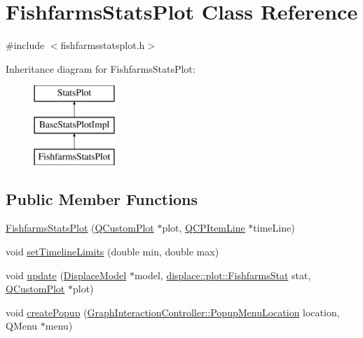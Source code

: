 \hypertarget{class_fishfarms_stats_plot}{}\section{Fishfarms\+Stats\+Plot Class Reference}
\label{class_fishfarms_stats_plot}


{\ttfamily \#include $<$fishfarmsstatsplot.\+h$>$}

Inheritance diagram for Fishfarms\+Stats\+Plot\+:\begin{figure}[H]
\begin{center}
\leavevmode
\includegraphics[height=3.000000cm]{da/d46/class_fishfarms_stats_plot}
\end{center}
\end{figure}
\subsection*{Public Member Functions}
\begin{DoxyCompactItemize}
\item 
\mbox{\hyperlink{class_fishfarms_stats_plot_aaf74f522a65c0403993f60f1a1a23f09}{Fishfarms\+Stats\+Plot}} (\mbox{\hyperlink{class_q_custom_plot}{Q\+Custom\+Plot}} $\ast$plot, \mbox{\hyperlink{class_q_c_p_item_line}{Q\+C\+P\+Item\+Line}} $\ast$time\+Line)
\item 
void \mbox{\hyperlink{class_fishfarms_stats_plot_a2e4fa56345e351504d49824db7691d30}{set\+Timeline\+Limits}} (double min, double max)
\item 
void \mbox{\hyperlink{class_fishfarms_stats_plot_a90281984f8eada59def8a778e04a0896}{update}} (\mbox{\hyperlink{class_displace_model}{Displace\+Model}} $\ast$model, \mbox{\hyperlink{namespacedisplace_1_1plot_a4746af73ffe0625cf87b8fb07fd5bfa4}{displace\+::plot\+::\+Fishfarms\+Stat}} stat, \mbox{\hyperlink{class_q_custom_plot}{Q\+Custom\+Plot}} $\ast$plot)
\item 
void \mbox{\hyperlink{class_fishfarms_stats_plot_afd4b993166feb348811d4ab9d0ebb6fa}{create\+Popup}} (\mbox{\hyperlink{class_graph_interaction_controller_a67e6eba082927bf2b984bed54fe32764}{Graph\+Interaction\+Controller\+::\+Popup\+Menu\+Location}} location, Q\+Menu $\ast$menu)
\end{DoxyCompactItemize}
